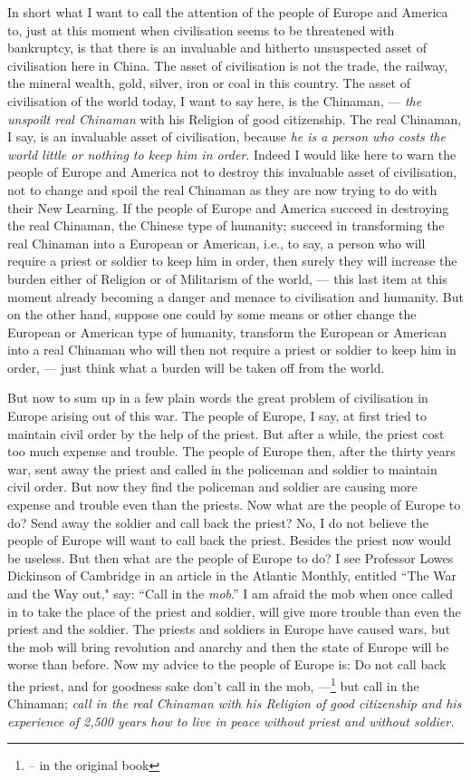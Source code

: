 In short what I want to call the attention of the people of Europe and America to, just at this moment when civilisation seems to be threatened with bankruptcy, is that there is an invaluable and hitherto unsuspected asset of civilisation here in China.
The asset of civilisation is not the trade, the railway, the mineral wealth, gold, silver, iron or coal in this country.
The asset of civilisation of the world today, I want to say here, is the Chinaman, --- \emph{the unspoilt real Chinaman} with his Religion of good citizenship. The real Chinaman, I say, is an invaluable asset of civilisation, because \emph{he is a person who costs the world little or nothing to keep him in order}.
Indeed I would like here to warn the people of Europe and America not to destroy this invaluable asset of civilisation, not to change and spoil the real Chinaman as they are now trying to do with their New Learning.
If the people of Europe and America succeed in destroying the real Chinaman, the Chinese type of humanity; succeed in transforming the real Chinaman into a European or American, i.e., to say, a person who will require a priest or soldier to keep him in order, then surely they will increase the burden either of Religion or of Militarism of the world, --- this last item at this moment already becoming a danger and menace to civilisation and humanity.
But on the other hand, suppose one could by some means or other change the European or American type of humanity, transform the European or American into a real Chinaman who will then not require a priest or soldier to keep him in order, --- just think what a burden will be taken off from the world.

But now to sum up in a few plain words the great problem of civilisation in Europe arising out of this war.
The people of Europe, I say, at first tried to maintain civil order by the help of the priest.
But after a while, the priest cost too much expense and trouble.
The people of Europe then, after the thirty years war, sent away the priest and called in the policeman and soldier to maintain civil order.
But now they find the policeman and soldier are causing more expense and trouble even than the priests.
Now what are the people of Europe to do?
Send away the soldier and call back the priest?
No, I do not believe the people of Europe will want to call back the priest.
Besides the priest now would be useless.
But then what are the people of Europe to do?
I see Professor Lowes Dickinson of Cambridge in an article in the Atlantic Monthly, entitled ``The War and the Way out," say: ``Call in the \emph{mob}.''
I am afraid the mob when once called in to take the place of the priest and soldier, will give more trouble than even the priest and the soldier.
The priests and soldiers in Europe have caused wars, but the mob will bring revolution and anarchy and then the state of Europe will be worse than before.
Now my advice to the people of Europe is: Do not call back the priest, and for goodness sake don't call in the mob, ---\footnote{-- in the original book} but call in the Chinaman; \emph{call in the real Chinaman with his Religion of good citizenship and his experience of 2,500 years how to live in peace without priest and without soldier.}

